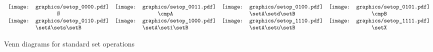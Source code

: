 \begin{figure}
  \centering%
  $\begin{array}{*{4}{c}}
      \texttt{[image: graphics/setop\_0000.pdf]}%
     &\texttt{[image: graphics/setop\_0011.pdf]}%
     &\texttt{[image: graphics/setop\_0100.pdf]}%
     &\texttt{[image: graphics/setop\_0101.pdf]}%
    \\%
      \emptyset
     &\cmpA
     &\setA\setd\setB
     &\cmpB
    \\%
      \texttt{[image: graphics/setop\_0110.pdf]}%
     &\texttt{[image: graphics/setop\_1000.pdf]}%
     &\texttt{[image: graphics/setop\_1110.pdf]}%
     &\texttt{[image: graphics/setop\_1111.pdf]}%
    \\%
      \setA\sets\setB
     &\setA\seti\setB
     &\setA\setu\setB
     &\setX
  \end{array}$
  \caption{Venn diagrams for standard set operations  \label{fig:setops}}
\end{figure}
